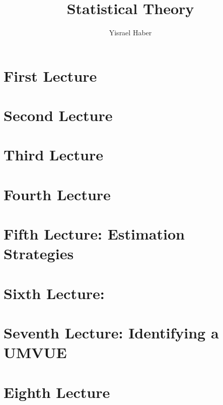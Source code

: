 \documentclass{article}
\title{Statistical Theory}
\author{Yisrael Haber}
\begin{document}
\maketitle
\newtheorem{theorem}{Theorem}[section]
\newtheorem{example}{Example}[section]
\newtheorem{exercise}{Exercise}[section]
\newtheorem{lemma}{Lemma}[section]

\theoremstyle{definition}
\newtheorem{definition}{Definition}[section]

\newtheorem{claim}{Claim}[section]
\renewcommand\qedsymbol{$\blacksquare$}

\tableofcontents
\newpage

\section{First Lecture}

\newpage

\section{Second Lecture}

\newpage

\section{Third Lecture}

\newpage

\section{Fourth Lecture}

\newpage

\section{Fifth Lecture: Estimation Strategies}

\newpage

\section{Sixth Lecture:}

\newpage

\section{Seventh Lecture: Identifying a UMVUE}

\newpage

\section{Eighth Lecture}

\newpage
\end{document}
